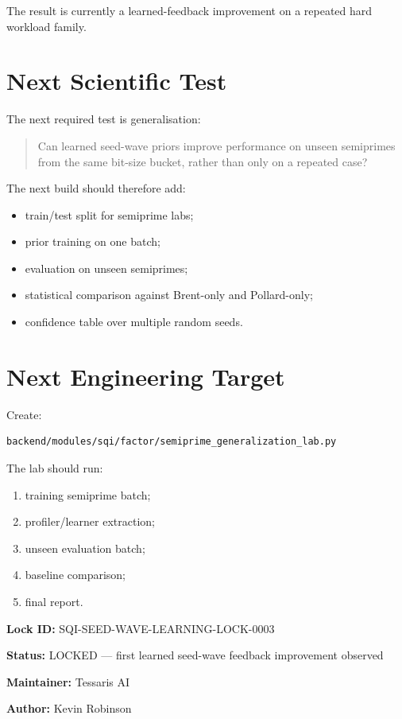 \documentclass[11pt,a4paper]{article}
\begin{document}
The result is currently a learned-feedback improvement on a repeated hard workload family.

\section{Next Scientific Test}

The next required test is generalisation:

\begin{quote}
Can learned seed-wave priors improve performance on unseen semiprimes from the same
bit-size bucket, rather than only on a repeated case?
\end{quote}

The next build should therefore add:

\begin{itemize}
  \item train/test split for semiprime labs;
  \item prior training on one batch;
  \item evaluation on unseen semiprimes;
  \item statistical comparison against Brent-only and Pollard-only;
  \item confidence table over multiple random seeds.
\end{itemize}

\section{Next Engineering Target}

Create:

\begin{verbatim}
backend/modules/sqi/factor/semiprime_generalization_lab.py
\end{verbatim}

The lab should run:

\begin{enumerate}
  \item training semiprime batch;
  \item profiler/learner extraction;
  \item unseen evaluation batch;
  \item baseline comparison;
  \item final report.
\end{enumerate}

\bigskip

\noindent\textbf{Lock ID:} SQI-SEED-WAVE-LEARNING-LOCK-0003

\noindent\textbf{Status:} LOCKED --- first learned seed-wave feedback improvement observed

\noindent\textbf{Maintainer:} Tessaris AI

\noindent\textbf{Author:} Kevin Robinson
\end{document}
